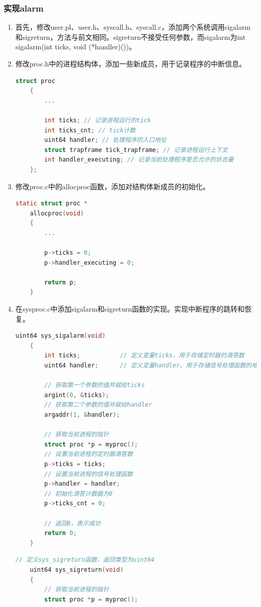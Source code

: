 \subsubsection{实现alarm}
\begin{enumerate}
    \item 首先，修改user.pl、user.h、syscall.h、syscall.c，添加两个系统调用sigalarm和sigreturn，方法与前文相同。sigreturn不接受任何参数，而sigalarm为int sigalarm(int ticks, void (*handler)())。
    \item 修改proc.h中的进程结构体，添加一些新成员，用于记录程序的中断信息。
          \begin{lstlisting}[language=c, title=对进程结构体的修改]
    struct proc
    {
        ...

        int ticks; // 记录进程运行的tick
        int ticks_cnt; // tick计数
        uint64 handler; // 处理程序的入口地址
        struct trapframe tick_trapframe; // 记录进程运行上下文
        int handler_executing; // 记录当前处理程序是否允许的状态量
    };
    \end{lstlisting}
    \item 修改proc.c中的allocproc函数，添加对结构体新成员的初始化。
          \begin{lstlisting}[language=c,title=对allocproc函数的修改]
    static struct proc *
    allocproc(void)
    {
        ...

        p->ticks = 0;
        p->handler_executing = 0;

        return p;
    }
    \end{lstlisting}
    \item 在sysproc.c中添加sigalarm和sigreturn函数的实现。实现中断程序的跳转和恢复。
          \begin{lstlisting}[language=c,title=sys\_sigalarm的实现]
    uint64 sys_sigalarm(void)
    {
        int ticks;           // 定义变量ticks，用于存储定时器的滴答数
        uint64 handler;      // 定义变量handler，用于存储信号处理函数的地址

        // 获取第一个参数的值并赋给ticks
        argint(0, &ticks);   
        // 获取第二个参数的值并赋给handler
        argaddr(1, &handler);

        // 获取当前进程的指针
        struct proc *p = myproc();
        // 设置当前进程的定时器滴答数
        p->ticks = ticks;
        // 设置当前进程的信号处理函数
        p->handler = handler;
        // 初始化滴答计数器为0
        p->ticks_cnt = 0;

        // 返回0，表示成功
        return 0;
    }
    \end{lstlisting}
          \newpage
          \begin{lstlisting}[language=c,title=sys\_sigreturn的实现]
    // 定义sys_sigreturn函数，返回类型为uint64
    uint64 sys_sigreturn(void)
    {
        // 获取当前进程的指针
        struct proc *p = myproc();
    

\end{lstlisting}
\end{enumerate}
